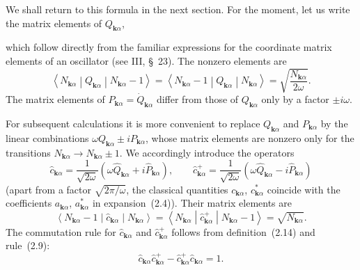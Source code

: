 We shall return to this formula in the next section. For the moment, let us write the matrix elements of $Q_{\mathbf{k}\alpha}$,

which follow directly from the familiar expressions for the coordinate matrix elements of an oscillator (see III, \S~23). The nonzero elements are
\begin{equation}
\left\langle N_{\mathbf{k}\alpha}\middle|Q_{\mathbf{k}\alpha}\middle|N_{\mathbf{k}\alpha}-1\right\rangle
=\left\langle N_{\mathbf{k}\alpha}-1\middle|Q_{\mathbf{k}\alpha}\middle|N_{\mathbf{k}\alpha}\right\rangle
=\sqrt{\frac{N_{\mathbf{k}\alpha}}{2\omega}}.
\tag{2.13}
\end{equation}
The matrix elements of $P_{\mathbf{k}\alpha}=\dot{Q}_{\mathbf{k}\alpha}$ differ from those of $Q_{\mathbf{k}\alpha}$ only by a factor $\pm i\omega$.

For subsequent calculations it is more convenient to replace $Q_{\mathbf{k}\alpha}$ and $P_{\mathbf{k}\alpha}$ by the linear combinations $\omega Q_{\mathbf{k}\alpha}\pm iP_{\mathbf{k}\alpha}$, whose matrix elements are nonzero only for the transitions $N_{\mathbf{k}\alpha}\to N_{\mathbf{k}\alpha}\pm1$. We accordingly introduce the operators
\begin{equation}
\widehat{c}_{\mathbf{k}\alpha}=\frac{1}{\sqrt{2\omega}}\left(\omega\widehat{Q}_{\mathbf{k}\alpha}+i\widehat{P}_{\mathbf{k}\alpha}\right),\qquad
\widehat{c}_{\mathbf{k}\alpha}^{+}=\frac{1}{\sqrt{2\omega}}\left(\omega\widehat{Q}_{\mathbf{k}\alpha}-i\widehat{P}_{\mathbf{k}\alpha}\right)
\tag{2.14}
\end{equation}
(apart from a factor $\sqrt{2\pi/\omega}$, the classical quantities $c_{\mathbf{k}\alpha}$, $c_{\mathbf{k}\alpha}^*$ coincide with the coefficients $a_{\mathbf{k}\alpha}$, $a_{\mathbf{k}\alpha}^*$ in expansion~(2.4)). Their matrix elements are
\begin{equation}
\left\langle N_{\mathbf{k}\alpha}-1\middle|\widehat{c}_{\mathbf{k}\alpha}\middle|N_{\mathbf{k}\alpha}\right\rangle
=\left\langle N_{\mathbf{k}\alpha}\middle|\widehat{c}_{\mathbf{k}\alpha}^{+}\middle|N_{\mathbf{k}\alpha}-1\right\rangle
=\sqrt{N_{\mathbf{k}\alpha}}.
\tag{2.15}
\end{equation}
The commutation rule for $\widehat{c}_{\mathbf{k}\alpha}$ and $\widehat{c}_{\mathbf{k}\alpha}^{+}$ follows from definition~(2.14) and rule~(2.9):
\begin{equation}
\widehat{c}_{\mathbf{k}\alpha}\widehat{c}_{\mathbf{k}\alpha}^{+}-\widehat{c}_{\mathbf{k}\alpha}^{+}\widehat{c}_{\mathbf{k}\alpha}=1.
\tag{2.16}
\end{equation}

